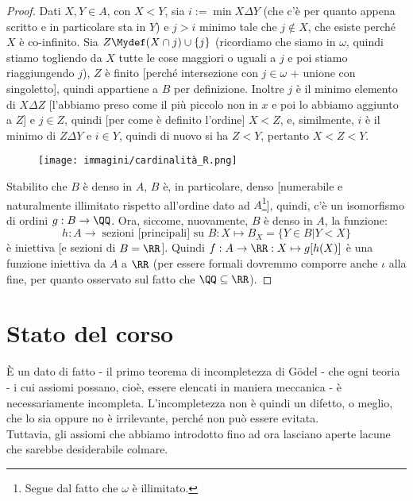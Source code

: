 \documentclass[11pt]{scrartcl}
\begin{document}
\begin{proof}
	Dati $X,Y \in A$, con $X < Y$, sia $i := \min X \Delta Y$ (che c'è per quanto appena scritto e in particolare sta in $Y$) e $j > i$ minimo tale che $j \not \in X$, che esiste perché $X$ è co-infinito. Sia $Z \Mydef (X \cap j) \cup \{j\}$ (ricordiamo che siamo in $\omega$,
	quindi stiamo togliendo da $X$ tutte le cose maggiori o uguali a $j$ e poi stiamo riaggiungendo $j$),
	$Z$ è finito [perché intersezione con $j\in \omega$ + unione con singoletto], quindi appartiene a $B$ per definizione. Inoltre $j$ è il minimo elemento di $X \Delta Z$ [l'abbiamo preso come il più piccolo non in $x$ e poi lo abbiamo aggiunto a $Z$] e $j \in Z$, quindi [per come è definito l'ordine] $X < Z$, e, similmente,
	$i$ è il minimo di $Z \Delta Y$ e $i \in Y$, quindi di nuovo si ha $Z < Y$, pertanto $X<Z<Y$.
	\begin{figure}[H]
		\centering
		\texttt{[image: immagini/cardinalità\_R.png]}
	\end{figure}
	Stabilito che $B$ è denso in $A$, $B$ è, in particolare, denso [numerabile e naturalmente illimitato rispetto all'ordine dato ad $A$\footnote{Segue dal fatto che $\omega$ è illimitato.}], quindi, c'è un isomorfismo di ordini $g : B \rightarrow \QQ$. Ora, siccome, nuovamente, $B$ è denso in $A$,
	la funzione:
	\[ h : A \rightarrow \; \text{sezioni [principali] su $B$} : X \mapsto B_X = \{Y \in B | Y < X\}
		\]
	è iniettiva [e sezioni di $B = \RR$]. Quindi $f : A \rightarrow \RR : X \mapsto g[h(X)]$ è una funzione iniettiva da $A$ a $\RR$ (per essere formali dovremmo comporre anche $\iota$ alla fine, per quanto osservato sul fatto che $\QQ\subseteq \RR$).
\end{proof}










\newpage
\section*{Stato del corso}
È un dato di fatto - il primo teorema di incompletezza di Gödel - che ogni teoria  - i cui assiomi possano, cioè, essere elencati 
in maniera meccanica - è necessariamente incompleta. L'incompletezza non è quindi un difetto, o meglio, che lo sia oppure no è irrilevante, perché 
non può essere evitata.\\
Tuttavia, gli assiomi che abbiamo introdotto fino ad ora lasciano aperte lacune che sarebbe desiderabile colmare.
\end{document}
